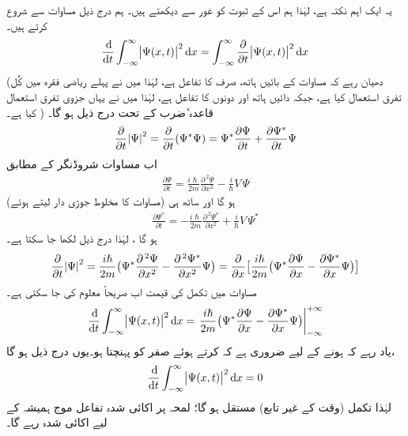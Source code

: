  یہ ایک اہم  نکتہ ہے، لہٰذا ہم اس کے ثبوت کو غور سے دیکھتے ہیں۔ ہم درج ذیل مساوات سے شروع کرتے ہیں۔
\begin{align}\label{مساوات_تفاعل_موج_الف}
\frac{\dif}{\dif t} \int_{-\infty}^{\infty} \abs{ \Psi (x , t)}^2 \dif x = \int_{- \infty}^{\infty} \frac{ \partial}{\partial t} \abs{ \Psi (x , t)}^2 \dif x 
\end{align}
(دھیان رہے کہ  مساوات کے بائیں ہاتھ،  صرف  کا تفاعل ہے، لہٰذا میں نے پہلے  ریاضی فقرہ میں کُل تفرق  استعمال کیا ہے، جبکہ دائیں ہاتھ    اور  دونوں کا تفاعل ہے،  لہٰذا میں نے یہاں جزوی تفرق  استعمال کیا ہے۔ ) قاعدہ   ٔضرب کے تحت درج ذیل ہو گا۔
\begin{align}
\frac{\partial}{\partial t}\abs{\Psi}^2=\frac{\partial}{\partial t}(\Psi^*\Psi)=\Psi^*\frac{\partial \Psi}{\partial t}+\frac{\partial \Psi^*}{\partial t}\Psi
\end{align}
اب مساوات شروڈنگر  کے مطابق
\begin{align}\label{مساوات_تفاعل_موج_شروڈنگر_تفرق_الف}
\frac{\partial \Psi}{\partial t}=\frac{i\hslash}{2m}\frac{\partial^{\,2}\Psi}{\partial x^2}-\frac{i}{\hslash}V\, \Psi
\end{align}
ہو گا اور ساتھ ہی (مساوات  کا مخلوط جوڑی دار لیتے ہوئے) 
\begin{align}\label{مساوات_تفاعل_موج_آخر}
\frac{\partial \Psi^*}{\partial t}=-\frac{i\hslash}{2m}\frac{\partial^{\,2}\Psi^*}{\partial x^2}+\frac{i}{\hslash}V\,\Psi^*
\end{align}
ہو گا ، لہٰذا درج ذیل لکھا جا سکتا ہے۔
\begin{align}\label{مساوات_تفاعل_موج_صریحاً_تکمل_الف}
\frac{\partial}{\partial t}\abs{\Psi}^2=\frac{i\hslash}{2m}\big(\Psi^*\frac{\partial^{\,2} \Psi}{\partial x^2}-\frac{\partial^{\,2}\Psi^*}{\partial x^2}\Psi\big)=\frac{\partial}{\partial x}\big[\frac{i\hslash}{2m}\big(\Psi^*\frac{\partial \Psi}{\partial x}-\frac{\partial \Psi^*}{\partial x}\Psi\big)\big]
\end{align}
مساوات  میں تکمل کی قیمت اب صریحاً معلوم کی جا سکتی ہے۔
\begin{align}
\frac{\dif}{\dif t}\int_{-\infty}^{\infty}\abs{\Psi(x,t)}^2\dif x=\left .\frac{i\hslash}{2m}\big(\Psi^*\frac{\partial \Psi}{\partial x}-\frac{\partial \Psi^*}{\partial x}\Psi\big)\right\vert_{-\infty}^{+\infty}
\end{align}
یاد رہے کہ  ہونے کے لیے ضروری ہے کہ  کرتے ہوئے  صفر کو پہنچتا ہو۔یوں درج ذیل ہو گا،
\begin{align}\label{مساوات_تفاعل_موج_تکمل_مستقل_ہو_گا}
\frac{\dif}{\dif t}\int_{-\infty}^{\infty}\abs{\Psi(x,t)}^2\dif x=0
\end{align}
لہٰذا تکمل  (وقت کے غیر تابع) مستقل ہو گا؛ لمحہ  پر اکائی شدہ تفاعل موج ہمیشہ کے لیے اکائی شدہ رہے گا۔


